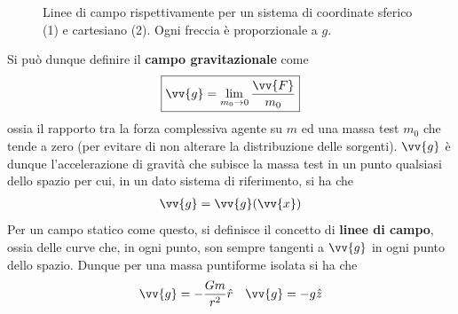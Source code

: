 \documentclass[a4paper, oneside]{book}
\begin{document}
\begin{figure}
    \centering
    \caption{Linee di campo rispettivamente per un sistema di coordinate
    sferico (1) e cartesiano (2). Ogni freccia è proporzionale a $g$.}
\end{figure}\noindent
Si può dunque definire il \textbf{campo gravitazionale} come
\begin{align}
    \boxed{\vv{g} = \lim_{m_0 \to 0}\frac{\vv{F} }{m_0}  }
\end{align}
ossia il rapporto tra la forza complessiva agente su $m$ ed una massa test $m_0$ 
che tende a zero (per evitare di non alterare la distribuzione delle sorgenti). 
$\vv{g}$ è dunque l'accelerazione di gravità che subisce la massa test in un punto qualsiasi dello spazio
per cui, in un dato sistema di riferimento, si ha che
\begin{gather*}
    \vv{g} = \vv{g} (\vv{x} )  
\end{gather*} 
Per un campo statico come questo, si definisce il concetto di \textbf{linee di campo}, ossia delle curve
che, in ogni punto, son sempre tangenti a $\vv{g}$ in ogni punto dello spazio. Dunque per una massa 
puntiforme isolata si ha che
\begin{gather*}
    \vv{g} = - \frac{Gm}{r^{2}}\hat{r} \quad \vv{g} = -g\hat{z}    
\end{gather*} 
\end{document}
